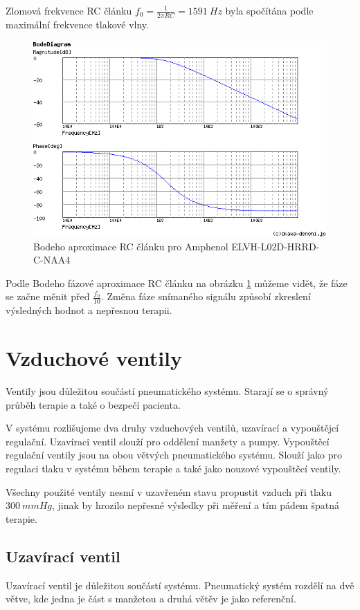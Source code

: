 \raggedbottom
Zlomová frekvence RC článku $f_0 = \frac{1}{2 \pi RC} = 1591 \ Hz $ byla spočítána podle maximální frekvence tlakové vlny.

\begin{figure}[H]
    \centering
    \includegraphics[width=0.9\linewidth]{pictures/rc_1k_100n_1591.png}
    \caption{Bodeho aproximace RC článku pro Amphenol ELVH-L02D-HRRD-C-NAA4}
    \label{fig:amphenol_filter}
\end{figure}

Podle Bodeho fázové aproximace RC článku na obrázku \ref{fig:amphenol_filter} můžeme vidět, že fáze se začne měnit před $\frac{f_0}{10}$.
Změna fáze snímaného signálu způsobí zkreslení výsledných hodnot a nepřesnou terapii.
\section{Vzduchové ventily}
Ventily jsou důležitou součástí pneumatického systému. Starají se o správný průběh terapie a také o bezpečí pacienta. \par
V systému rozlišujeme dva druhy vzduchových ventilů, uzavírací a vypouštějcí regulační. Uzavíraci ventil slouží pro oddělení manžety a pumpy. Vypouštěcí regulační ventily jsou na obou větvých pneumatického systému. Slouží jako pro regulaci tlaku v systému během terapie a také jako nouzové vypouštěcí ventily. \par
Všechny použité ventily nesmí v uzavřeném stavu propustit vzduch při tlaku $300 \ mmHg$, jinak by hrozilo nepřesné výsledky při měření a tím pádem špatná terapie.

\subsection{Uzavírací ventil}
Uzavírací ventil je důležitou součástí systému. Pneumatický systém rozdělí na dvě větve, kde jedna je část s manžetou a druhá větěv je jako referenční. \par

